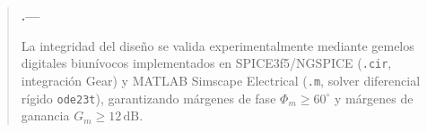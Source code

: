 \documentclass[11pt,a4paper,titlepage,oneside]{book}
\newenvironment{abstract}{%
    \begin{quotation}\small\noindent\textbf{\abstractname.---}\ignorespaces
}{%
    \end{quotation}\par\bigskip
}
\begin{document}
\begin{abstract}
La integridad del diseño se valida experimentalmente mediante gemelos digitales biunívocos implementados en SPICE3f5/NGSPICE (\texttt{.cir}, integración Gear) y MATLAB Simscape Electrical (\texttt{.m}, solver diferencial rígido \texttt{ode23t}), garantizando márgenes de fase $\Phi_m \ge 60^\circ$ y márgenes de ganancia $G_m \ge 12\,\mathrm{dB}$.
\end{abstract}

\tableofcontents
\listoffigures
\cleardoublepage

\mainmatter



\appendix


\end{document}
